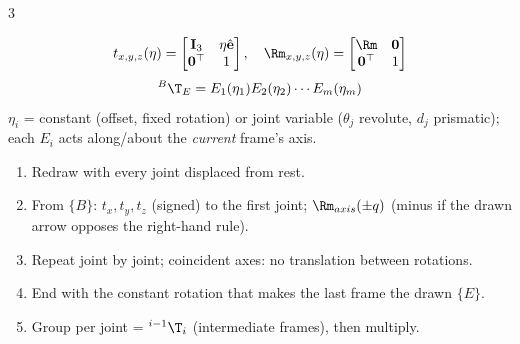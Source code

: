 \begin{multicols}{3}
\begin{fbx}
\[t_{x,y,z}(\eta)=\begin{bmatrix}\mathbf I_3&\eta\hat{\mathbf e}\\\mathbf 0^\top&1\end{bmatrix},\quad \Rm_{x,y,z}(\eta)=\begin{bmatrix}\Rm&\mathbf 0\\\mathbf 0^\top&1\end{bmatrix}\]
\[{}^B\T_E=E_1(\eta_1)E_2(\eta_2)\cdots E_m(\eta_m)\]
$\eta_i$ = constant (offset, fixed rotation) or joint variable ($\theta_j$ revolute, $d_j$ prismatic); each $E_i$ acts along/about the \emph{current} frame's axis.
\end{fbx}
\begin{recipe}
\begin{enumerate}
\item Redraw with every joint displaced from rest.
\item From $\{B\}$: $t_x,t_y,t_z$ (signed) to the first joint; $\Rm_{axis}(\pm q)$ (minus if the drawn arrow opposes the right-hand rule).
\item Repeat joint by joint; coincident axes: no translation between rotations.
\item End with the constant rotation that makes the last frame the drawn $\{E\}$.
\item Group per joint = ${}^{i-1}\T_i$ (intermediate frames), then multiply.
\end{enumerate}
\end{recipe}


\end{multicols}
